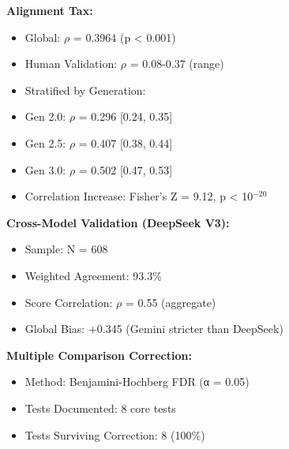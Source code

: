 \documentclass[sigconf,screen]{acmart}
\begin{document}
\textbf{Alignment Tax:}
\begin{itemize}
\item Global: $\rho$ = 0.3964 (p < 0.001)
\item Human Validation: $\rho$ = 0.08-0.37 (range)
\item Stratified by Generation:
\item Gen 2.0: $\rho$ = 0.296 [0.24, 0.35]
\item Gen 2.5: $\rho$ = 0.407 [0.38, 0.44]
\item Gen 3.0: $\rho$ = 0.502 [0.47, 0.53]
\item Correlation Increase: Fisher's Z = 9.12, p < 10$^{-20}$

\end{itemize}
\textbf{Cross-Model Validation (DeepSeek V3):}
\begin{itemize}
\item Sample: N = 608
\item Weighted Agreement: 93.3\%
\item Score Correlation: $\rho$ = 0.55 (aggregate)
\item Global Bias: +0.345 (Gemini stricter than DeepSeek)

\end{itemize}
\textbf{Multiple Comparison Correction:}
\begin{itemize}
\item Method: Benjamini-Hochberg FDR (α = 0.05)
\item Tests Documented: 8 core tests
\item Tests Surviving Correction: 8 (100\%)

\end{itemize}

\end{document}
